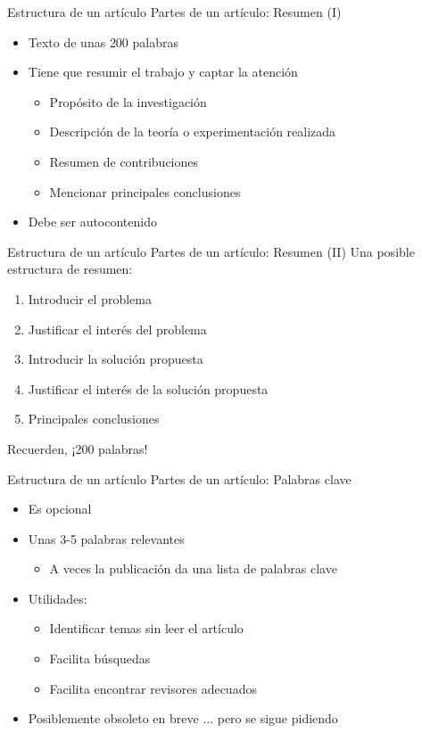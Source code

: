 \documentclass{beamer}
\begin{document}
\begin{frame}{Estructura de un artículo} {Partes de un artículo: Resumen (I)}
	\begin{itemize}
		\item Texto de unas \alert{200 palabras}
		\item Tiene que resumir el trabajo y \alert{captar la atención}
		\begin{itemize}
		\item Propósito de la investigación
		\item Descripción de la teoría o experimentación realizada
		\item Resumen de contribuciones
		\item Mencionar principales conclusiones
		\end{itemize}
		\item Debe ser autocontenido
	\end{itemize}
\end{frame}

\begin{frame}{Estructura de un artículo} {Partes de un artículo: Resumen (II)}
	Una posible estructura de resumen:
		\begin{enumerate}
		\item Introducir el problema
		\item Justificar el interés del problema
		\item Introducir la solución propuesta
		\item Justificar el interés de la solución propuesta
		\item Principales conclusiones
		\end{enumerate}
	Recuerden, ¡200 palabras!
\end{frame}

\begin{frame}{Estructura de un artículo} {Partes de un artículo: Palabras clave}
	\begin{itemize}
		\item Es opcional
		\item Unas 3-5 palabras relevantes
		\begin{itemize}
			\item A veces la publicación da una lista de palabras clave
		\end{itemize}
		\item Utilidades:
		\begin{itemize}
		\item Identificar temas sin leer el artículo
		\item Facilita búsquedas
		\item Facilita encontrar revisores adecuados
		\end{itemize}
		\item Posiblemente obsoleto en breve ... pero se sigue pidiendo
	\end{itemize}
\end{frame}
\end{document}
